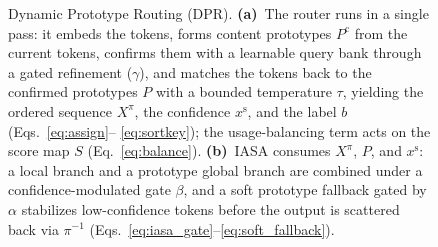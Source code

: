 \begin{figure}[t]
{\begin{tikzpicture}
\end{tikzpicture}%
}
\caption{Dynamic Prototype Routing (DPR). \textbf{(a)}~The router runs in a single
pass: it embeds the tokens, forms content prototypes $P^{\mathrm{c}}$ from the
current tokens, confirms them with a learnable query bank through a gated
refinement ($\gamma$), and matches the tokens back to the confirmed prototypes $P$
with a bounded temperature $\tau$, yielding the ordered sequence $X^{\pi}$, the
confidence $x^{\mathrm{s}}$, and the label $b$ (Eqs.~\eqref{eq:assign}--%
\eqref{eq:sortkey}); the usage-balancing term acts on the score map $S$
(Eq.~\eqref{eq:balance}). \textbf{(b)}~IASA consumes $X^{\pi}$, $P$, and
$x^{\mathrm{s}}$: a local branch and a prototype global branch are combined under a
confidence-modulated gate $\beta$, and a soft prototype fallback gated by $\alpha$
stabilizes low-confidence tokens before the output is scattered back via $\pi^{-1}$
(Eqs.~\eqref{eq:iasa_gate}--\eqref{eq:soft_fallback}).}
\label{fig:dpr}
\end{figure}
